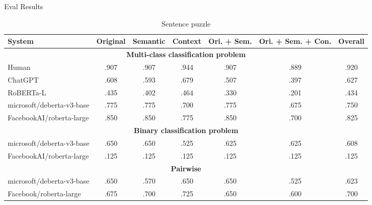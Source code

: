 Eval Results

\begin{table*}
	\caption{Sentence puzzle}
	\label{tab:sentence-results-table}
	\begin{center}
		\begin{tabular}{lcccccc}
			\toprule
			\textbf{System}           & \textbf{Original} & \textbf{Semantic} & \textbf{Context} & \textbf{Ori. + Sem.} & \textbf{Ori. + Sem. + Con.} & \textbf{Overall} \\
			\midrule
			\multicolumn{7}{c}{\textbf{Multi-class classification problem}}                                                                                              \\
			\midrule
			\color{gray}Human         & \color{gray}.907  & \color{gray}.907  & \color{gray}.944 & \color{gray}.907     & \color{gray}.889            & \color{gray}.920 \\
			\color{gray}ChatGPT       & \color{gray}.608  & \color{gray}.593  & \color{gray}.679 & \color{gray}.507     & \color{gray}.397            & \color{gray}.627 \\
			\color{gray}RoBERTa-L     & \color{gray}.435  & \color{gray}.402  & \color{gray}.464 & \color{gray}.330     & \color{gray}.201            & \color{gray}.434 \\
			\midrule
			microsoft/deberta-v3-base & .775              & .775              & .700             & .775                 & .675                        & .750             \\
			FacebookAI/roberta-large  & .850              & .850              & .775             & .850                 & .700                        & .825             \\
			\midrule
			\multicolumn{7}{c}{\textbf{Binary classification problem}}                                                                                                   \\
			microsoft/deberta-v3-base & .650              & .650              & .525             & .625                 & .625                        & .608             \\
			FacebookAI/roberta-large  & .125              & .125              & .125             & .125                 & .125                        & .125             \\
			\midrule
			\multicolumn{7}{c}{\textbf{Pairwise}}                                                                                                                        \\
			\midrule
			microsoft/deberta-v3-base & .650              & .570              & .650             & .650                 & .525                        & .623             \\
			Facebook/roberta-large    & .675              & .700              & .725             & .650                 & .600                        & .700             \\
			\bottomrule
		\end{tabular}
	\end{center}
\end{table*}

